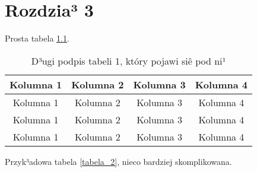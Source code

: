 \chapter{Rozdzia³ 3}

Prosta tabela \ref{tabela_1}.

\begin{table}[htb]
\centering
\begin{tabular}{|c|c|c|c|}
\hline
Kolumna 1 & Kolumna 2 & Kolumna 3 & Kolumna 4 \\\hline
Kolumna 1 & Kolumna 2 & Kolumna 3 & Kolumna 4 \\\hline
Kolumna 1 & Kolumna 2 & Kolumna 3 & Kolumna 4 \\\hline
Kolumna 1 & Kolumna 2 & Kolumna 3 & Kolumna 4 \\\hline
\end{tabular}
\caption[Krótki podpis tabeli 1 -- do spisu treci]{D³ugi podpis tabeli 1, który pojawi siê pod ni¹}
\label{tabela_1}
\end{table}

Przyk³adowa tabela \ref{tabela_2}, nieco bardziej skomplikowana.

